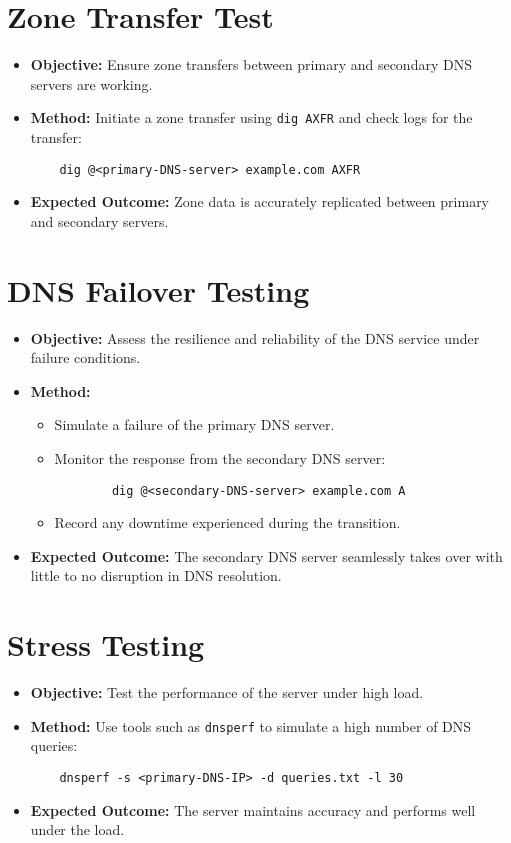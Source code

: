 \documentclass[a4paper,12pt]{article}
\begin{document}
\section*{Zone Transfer Test}
\begin{itemize}[leftmargin=1.5cm]
    \item \textbf{Objective:} Ensure zone transfers between primary and secondary DNS servers are working.
    \item \textbf{Method:} Initiate a zone transfer using \texttt{dig AXFR} and check logs for the transfer:
    \begin{verbatim}
    dig @<primary-DNS-server> example.com AXFR
    \end{verbatim}
    \item \textbf{Expected Outcome:} Zone data is accurately replicated between primary and secondary servers.
\end{itemize}

\section*{DNS Failover Testing}
\begin{itemize}[leftmargin=1.5cm]
    \item \textbf{Objective:} Assess the resilience and reliability of the DNS service under failure conditions.
    \item \textbf{Method:}
    \begin{itemize}
        \item Simulate a failure of the primary DNS server.
        \item Monitor the response from the secondary DNS server:
        \begin{verbatim}
        dig @<secondary-DNS-server> example.com A
        \end{verbatim}
        \item Record any downtime experienced during the transition.
    \end{itemize}
    \item \textbf{Expected Outcome:} The secondary DNS server seamlessly takes over with little to no disruption in DNS resolution.
\end{itemize}

\section*{Stress Testing}
\begin{itemize}[leftmargin=1.5cm]
    \item \textbf{Objective:} Test the performance of the server under high load.
    \item \textbf{Method:} Use tools such as \texttt{dnsperf} to simulate a high number of DNS queries:
    \begin{verbatim}
    dnsperf -s <primary-DNS-IP> -d queries.txt -l 30
    \end{verbatim}
    \item \textbf{Expected Outcome:} The server maintains accuracy and performs well under the load.
\end{itemize}
\end{document}
